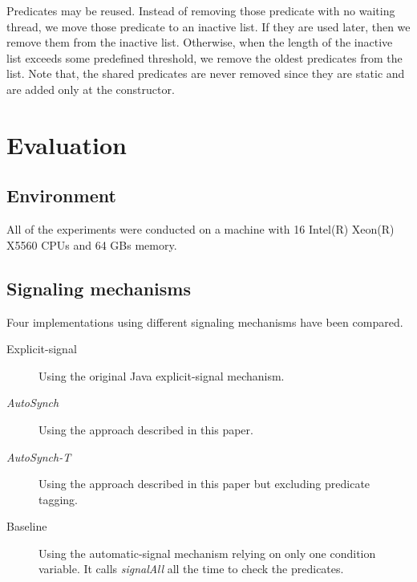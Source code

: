 \documentclass[preprint]{sigplanconf}
\begin{document}
Predicates may be reused. Instead  of removing those predicate with no waiting
thread, 
we move those predicate to an inactive list. If they are used later, then we 
remove them from the inactive list. Otherwise, when the length of the inactive list exceeds some 
predefined threshold, we remove the oldest predicates from the list. Note that, the shared
predicates are never removed since they are static and are added only at the
constructor. 


\section{Evaluation} \label{sec:eval}
\subsection{Environment}
All of the experiments were conducted on a machine with 16 
Intel(R) Xeon(R) X5560 CPUs and 64 GBs memory. 


\subsection{Signaling mechanisms}
Four implementations using different signaling mechanisms have been 
compared. 
\begin{description}
    \item[Explicit-signal] Using the original Java explicit-signal mechanism. 
    \item[{\em AutoSynch}] Using the approach described in this paper. 
    \item[{\em AutoSynch-T}] Using the approach described in this paper but excluding
        predicate tagging. 
    \item[Baseline] Using the automatic-signal mechanism relying on only
        one condition variable. It calls {\em signalAll} all the time to check the
        predicates.
\end{description}
\end{document}
